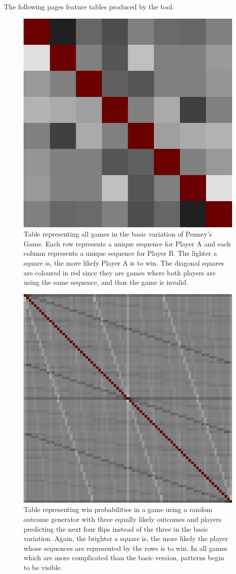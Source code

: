\documentclass[english,12pt,a4paper,final]{article}
\begin{document}
The following pages feature tables produced by the tool.

\newpage

\begin{figure}[H]
	\centering
	\includegraphics[width=0.5\linewidth]{s2k3}
	\caption{Table representing all games in the basic variation of Penney's Game. Each row represents a unique sequence for Player A and each column represents a unique sequence for Player B. The lighter a square is, the more likely Player A is to win. The diagonal squares are coloured in red since they are games where both players are using the same sequence, and thus the game is invalid.}
	\label{fig:s2k3}
\end{figure}

\begin{figure} [H]
	\centering
	\includegraphics[width=0.5\linewidth]{s3k4}
	\caption{Table representing win probabilities in a game using a random outcome generator with three equally likely outcomes and players predicting the next four flips instead of the three in the basic variation. Again, the brighter a square is, the more likely the player whose sequences are represented by the rows is to win. In all games which are more complicated than the basic version, patterns begin to be visible.}
	\label{fig:s3k4}
\end{figure}
\end{document}
